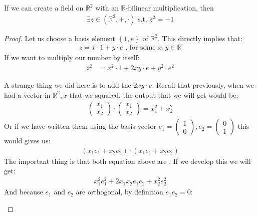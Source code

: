\begin{theoreme}
	If we can create a field on $ \mathbb{R}^2$ with an $\mathbb{R}$-bilinear multiplication, then 
	\begin{align*} \exists z \in\left(\mathbb{R}^{2}, +, \cdot \right) \text{ s.t. } z^2 =  -1 \end{align*}
\end{theoreme}
\begin{proof}

    Let us choose a basis element $\left\{1, e\right\}$ of $\mathbb{R}^{2}$. This directly implies that:
	\begin{align*} 
		z = x \cdot 1 + y \cdot e \text{ , for some } x, y \in \mathbb{R}
	\end{align*}
	If we want to multiply our number by itself:
	\begin{align*} 
		z^2 &= x^2 \cdot 1 + 2xy \cdot e + y^2 \cdot  e^2
	\end{align*}
	\begin{framedremark}
	A strange thing we did here is to add the $2xy \cdot e$. Recall that previously, when we had a vector in $\mathbb{R}^{2}, x$ that we squared, the output that we will get would be:
	\begin{align*} 
		\begin{pmatrix} x_1 \\ x_2 \end{pmatrix}  \cdot \begin{pmatrix} x_1 \\ x_2 \end{pmatrix}  = x_1^2 + x_2^2
	\end{align*}
	Or if we have written them using the basis vector $e_1 = \begin{pmatrix} 1 \\ 0 \end{pmatrix} , e_2 =  \begin{pmatrix} 0 \\ 1 \end{pmatrix} $ this would gives us:
	\begin{align*} 
		\left(x_1e_1 + x_2e_2\right) \cdot \left(x_1e_1 + x_2e_2\right)
	\end{align*}
	The important thing is that both equation above are . If we develop this we will get:
	\begin{align*} 
		x_1^2 e_1^2 + 2x_1x_2e_1e_2 +x_2^2e_2^2
	\end{align*}
	And because $e_1$ and $e_2$ are orthogonal, by definition $e_1e_2 = 0$:

\end{framedremark}
\end{proof}
